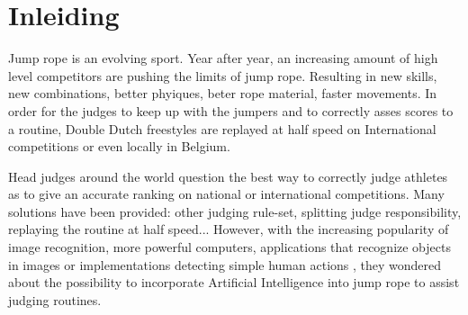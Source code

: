 
\section{Inleiding}%
\label{sec:inleiding}

    

Jump rope is an evolving sport.
Year after year, an increasing amount of high level competitors are pushing the limits of jump rope.
Resulting in new skills, new combinations, better phyiques, beter rope material, faster movements.
In order for the judges to keep up with the jumpers and to correctly asses scores to a routine, Double Dutch freestyles are replayed at half speed on International competitions or even locally in Belgium.

Head judges around the world question the best way to correctly judge athletes as to give an accurate ranking on national or international competitions.
Many solutions have been provided: other judging rule-set, splitting judge responsibility, replaying the routine at half speed...
However, with the increasing popularity of image recognition, more powerful computers, applications that recognize objects in images \autocite{Singh_Gill_2022} or implementations detecting simple human actions \autocite{LUQMAN_2022}, they wondered about the possibility to incorporate Artificial Intelligence into jump rope to assist judging routines.


